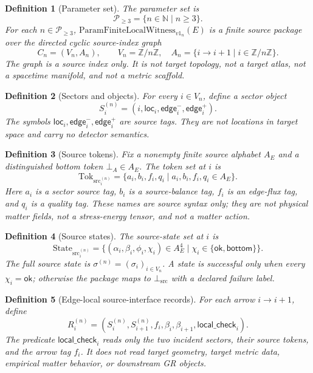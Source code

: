 \documentclass[11pt]{article}
\newcommand{\PFLFW}{\mathrm{ParamFiniteLocalWitness}_{v1}}
\newcommand{\SrcTok}{\mathrm{Tok}_{\mathrm{src}}}
\newcommand{\SrcSt}{\mathrm{State}_{\mathrm{src}}}
\newcommand{\BottomSrc}{\bot_{\mathrm{src}}}
\newtheorem{definition}{Definition}
\begin{document}
\begin{definition}[Parameter set]
The parameter set is
\[
  \mathcal{P}_{\ge 3}=\{n\in\mathbb{N}\mid n\ge 3\}.
\]
For each \(n\in\mathcal{P}_{\ge 3}\), \(\PFLFW_n(E)\) is a finite source
package over the directed cyclic source-index graph
\[
  C_n=(V_n,A_n),\qquad
  V_n=\mathbb{Z}/n\mathbb{Z},\quad
  A_n=\{i\to i+1\mid i\in\mathbb{Z}/n\mathbb{Z}\}.
\]
The graph is a source index only. It is not target topology, not a target
atlas, not a spacetime manifold, and not a metric scaffold.
\end{definition}

\begin{definition}[Sectors and objects]
For every \(i\in V_n\), define a sector object
\[
  S_i^{(n)}=(i,\mathsf{loc}_i,\mathsf{edge}^{-}_i,\mathsf{edge}^{+}_i).
\]
The symbols \(\mathsf{loc}_i,\mathsf{edge}^{-}_i,\mathsf{edge}^{+}_i\) are
source tags. They are not locations in target space and carry no detector
semantics.
\end{definition}

\begin{definition}[Source tokens]
Fix a nonempty finite source alphabet \(A_E\) and a distinguished bottom token
\(\bot_A\in A_E\). The token set at \(i\) is
\[
  \SrcTok_i^{(n)} =
  \{a_i,b_i,f_i,q_i\mid a_i,b_i,f_i,q_i\in A_E\}.
\]
Here \(a_i\) is a sector source tag, \(b_i\) is a source-balance tag, \(f_i\)
is an edge-flux tag, and \(q_i\) is a quality tag. These names are source
syntax only; they are not physical matter fields, not a stress-energy tensor,
and not a matter action.
\end{definition}

\begin{definition}[Source states]
The source-state set at \(i\) is
\[
  \SrcSt_i^{(n)} =
  \{(\alpha_i,\beta_i,\phi_i,\chi_i)\in A_E^4
  \mid \chi_i\in\{\mathsf{ok},\mathsf{bottom}\}\}.
\]
The full source state is \(\sigma^{(n)}=(\sigma_i)_{i\in V_n}\). A state is
successful only when every \(\chi_i=\mathsf{ok}\); otherwise the package maps
to \(\BottomSrc\) with a declared failure label.
\end{definition}

\begin{definition}[Edge-local source-interface records]
For each arrow \(i\to i+1\), define
\[
  R_i^{(n)} =
  (S_i^{(n)},S_{i+1}^{(n)}, f_i,\beta_i,\beta_{i+1},
  \mathsf{local\_check}_i).
\]
The predicate \(\mathsf{local\_check}_i\) reads only the two incident sectors,
their source tokens, and the arrow tag \(f_i\). It does not read target
geometry, target metric data, empirical matter behavior, or downstream GR
objects.
\end{definition}
\end{document}
